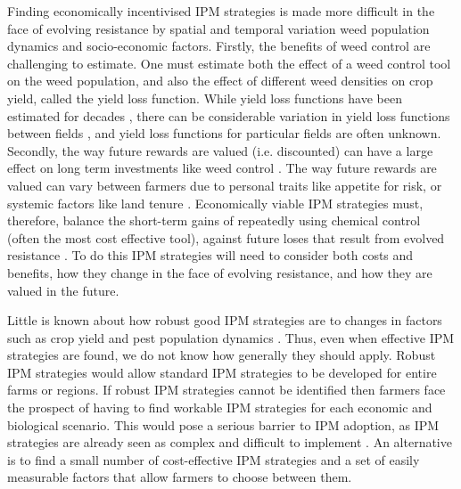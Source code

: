 \documentclass[9pt,twocolumn,twoside,lineno]{pnas-new}
\begin{document}
Finding economically incentivised IPM strategies is made more difficult in the face of evolving resistance by spatial and temporal variation weed population dynamics and socio-economic factors. Firstly, the benefits of weed control are challenging to estimate. One must estimate both the effect of a weed control tool on the weed population, and also the effect of different weed densities on crop yield, called the yield loss function. While yield loss functions have been estimated for decades \citep{Blea1960, Cous1985}, there can be considerable variation in yield loss functions between fields \citep{Swin1994}, and yield loss functions for particular fields are often unknown. Secondly, the way future rewards are valued (i.e. discounted) can have a large effect on long term investments like weed control \citep{Wies1996, Fras2004}. The way future rewards are valued can vary between farmers due to personal traits like appetite for risk, or systemic factors like land tenure \citep{Fras2004}. Economically viable IPM strategies must, therefore, balance the short-term gains of repeatedly using chemical control (often the most cost effective tool), against future loses that result from evolved resistance \citep{Hick2018}. To do this IPM strategies will need to consider both costs and benefits, how they change in the face of evolving resistance, and how they are valued in the future.  
        
Little is known about how robust good IPM strategies are to changes in factors such as crop yield and pest population dynamics \citep{EpanN2010}. Thus, even when effective IPM strategies are found, we do not know how generally they should apply. Robust IPM strategies would allow standard IPM strategies to be developed for entire farms or regions. If robust IPM strategies cannot be identified then farmers face the prospect of having to find workable IPM strategies for each economic and biological scenario. This would pose a serious barrier to IPM adoption, as IPM strategies are already seen as complex and difficult to implement \citep{Llew2006}. An alternative is to find a small number of cost-effective IPM strategies and a set of easily measurable factors that allow farmers to choose between them.
\end{document}

